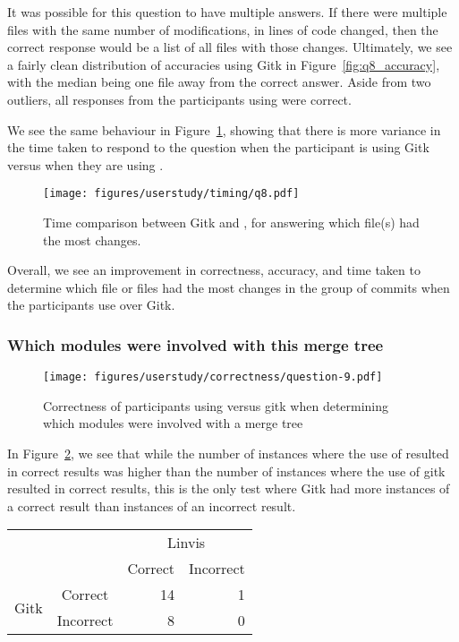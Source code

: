 It was possible for this question to have multiple answers. If there
were multiple files with the same number of modifications, in lines of
code changed, then the correct response would be a list of all files
with those changes. Ultimately, we see a fairly clean distribution of
accuracies using Gitk in Figure~\ref{fig:q8_accuracy}, with the median
being one file away from the correct answer. Aside from two outliers,
all responses from the participants using \tool were correct.

We see the same behaviour in Figure~\ref{fig:q8_timing}, showing that
there is more variance in the time taken to respond to the question when
the participant is using Gitk versus when they are using \tool.

\begin{figure}[htpb]
  \centering
  \texttt{[image: figures/userstudy/timing/q8.pdf]}
  \caption{Time comparison between Gitk and \tool, for answering which
    file(s) had the most changes.}
  \label{fig:q8_timing}
\end{figure}

Overall, we see an improvement in correctness, accuracy, and time taken
to determine which file or files had the most changes in the group of
commits when the participants use \tool over Gitk.

\subsubsection{Which modules were involved with this merge tree}
\label{ssub:which_modules_were_involved_with_this_merge_tree}

\begin{figure}[htpb]
  \centering
  \texttt{[image: figures/userstudy/correctness/question-9.pdf]}
  \caption{Correctness of participants using \tool versus gitk when
    determining which modules were involved with a merge tree}
  \label{fig:q_9_correctness}
\end{figure}

In Figure~\ref{fig:q_9_correctness}, we see that while the number of
instances where the use of \tool resulted in correct results was higher
than the number of instances where the use of gitk resulted in correct
results, this is the only test where Gitk had more instances of a
correct result than instances of an incorrect result.

\begin{center}
  \begin{tabular}{cc|rr}
                            &           & \multicolumn{2}{c}{Linvis}\\
                            &           & Correct                      & Incorrect\\\hline
    \multirow{2}{*}{Gitk}   & Correct   & 14                           & 1\\
                            & Incorrect & 8                            & 0\\
  \end{tabular}
\end{center}

